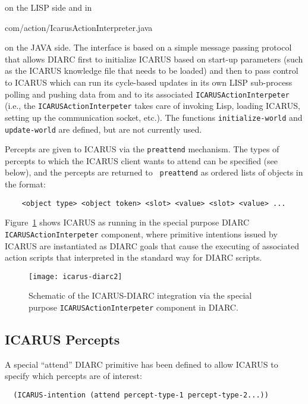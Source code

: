 \documentclass{article}
\begin{document}
\noindent on the LISP side and in

\vspace{2mm}
\centerline{com/action/IcarusActionInterpreter.java}
\vspace{2mm}

\noindent on the JAVA side.  The interface is based on a simple
message passing protocol that allows DIARC first to initialize ICARUS
based on start-up parameters (such as the ICARUS knowledge file that
needs to be loaded) and then to pass control to ICARUS which can run
its cycle-based updates in its own LISP sub-process polling and pushing
data from and to its associated {\tt ICARUSActionInterpeter} (i.e.,
the {\tt ICARUSActionInterpeter} takes care of invoking Lisp, loading
ICARUS, setting up the communication socket, etc.).  The functions
{\tt initialize-world} and {\tt update-world} are defined, but are not
currently used.

Percepts are given to ICARUS via the {\tt preattend} mechanism.  The 
types of percepts to which the ICARUS client wants to attend can be 
specified (see below), and the percepts are returned to {\tt 
preattend} as ordered lists of objects in the format:

\begin{verbatim}
    <object type> <object token> <slot> <value> <slot> <value> ...
\end{verbatim}

Figure~\ref{integration} shows ICARUS as running in the special
purpose DIARC {\tt ICARUSActionInterpeter} component, where primitive
intentions issued by ICARUS are instantiated as DIARC goals that cause
the executing of associated action scripts that interpreted in the
standard way for DIARC scripts.

\begin{figure}[t]
  \texttt{[image: icarus-diarc2]}
  \caption{Schematic of the ICARUS-DIARC integration via the special
    purpose {\tt ICARUSActionInterpeter} component in DIARC.}
  \label{integration}
\end{figure}


\subsection*{ICARUS Percepts}

A special ``attend'' DIARC primitive has been defined to allow ICARUS 
to specify which percepts are of interest:

\begin{verbatim}
  (ICARUS-intention (attend percept-type-1 percept-type-2...))
\end{verbatim}
\end{document}
